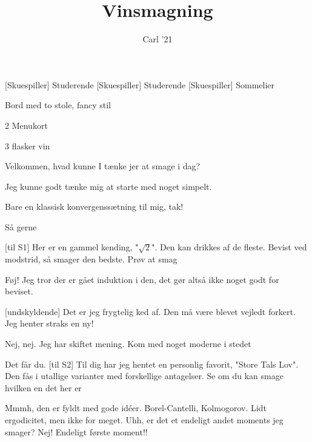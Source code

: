 \documentclass[a4paper,11pt]{article}
\title{Vinsmagning}
\author{Carl '21}
\begin{document}
\maketitle

\begin{roles}
[Skuespiller] Studerende
[Skuespiller] Studerende
[Skuespiller] Sommelier
\end{roles}

\begin{props}
\item Bord med to stole, fancy stil
\item 2 Menukort
\item 3 flasker vin
\end{props}


\begin{sketch}

 Velkommen, hvad kunne I tænke jer at smage i dag?

 Jeg kunne godt tænke mig at starte med noget simpelt.

 Bare en klassisk konvergenssætning til mig, tak!

 Så gerne


[til S1] Her er en gammel kending, "$\sqrt{2}$". Den kan drikkes af de fleste. Bevist ved modstrid, så smager den bedste. Prøv at smag


 Føj! Jeg tror der er gået induktion i den, det gør altså ikke noget godt for beviset.

[undskyldende] Det er jeg frygtelig ked af. Den må være blevet vejledt forkert. Jeg henter straks en ny!

 Nej, nej. Jeg har skiftet mening. Kom  med noget moderne i stedet

 Det får du.
[til S2] Til dig har jeg hentet en personlig favorit, "Store Tals Lov". Den fås i utallige varianter med forskellige antagelser. Se om du kan smage hvilken en det her er


 Mmmh, den er fyldt med gode idéer. Borel-Cantelli, Kolmogorov. Lidt ergodicitet, men ikke for meget. Uhh, er det et endeligt andet moments jeg smager? Nej! Endeligt første moment!!


\end{sketch}
\end{document}
